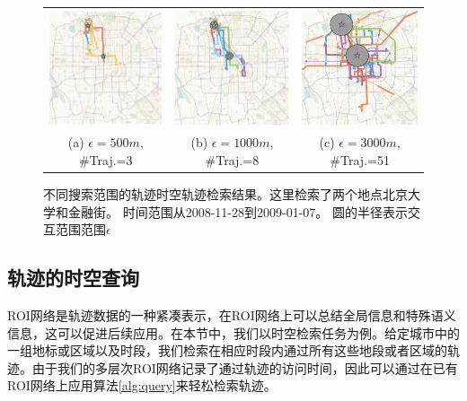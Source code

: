 \tabcolsep=1pt
\begin{figure}[!t]
\centering
\begin{tabular}{ccc}
\includegraphics[width=48mm]{pics/q500.eps}&
\includegraphics[width=48mm]{pics/q1000.eps}&
\includegraphics[width=48mm]{pics/q3000.eps}\\
(a) $\epsilon = 500m$, \#Traj.=3 & (b) $\epsilon = 1000m$, \#Traj.=8 & (c) $\epsilon = 3000m$, \#Traj.=51  \\
\end{tabular}
\caption{不同搜索范围的轨迹时空轨迹检索结果。这里检索了两个地点北京大学和金融街。 时间范围从2008-11-28到2009-01-07。 圆的半径表示交互范围范围$\epsilon$
}
\label{fig:queryResult}
\vspace{2mm}
\end{figure}


\subsection{轨迹的时空查询}
ROI网络是轨迹数据的一种紧凑表示，在ROI网络上可以总结全局信息和特殊语义信息，这可以促进后续应用。在本节中，我们以时空检索任务为例。给定城市中的一组地标或区域以及时段，我们检索在相应时段内通过所有这些地段或者区域的轨迹。由于我们的多层次ROI网络记录了通过轨迹的访问时间，因此可以通过在已有ROI网络上应用算法\ref{alg:query}来轻松检索轨迹。

